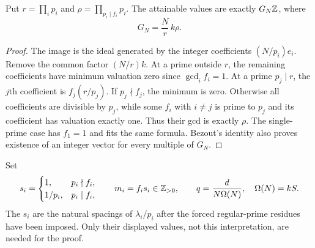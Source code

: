 \begin{lemma}\label{power:lem:ideal}
Put $r=\prod_i p_i$ and $\rho=\prod_{p_i\mid f_i}p_i$. The attainable
values are exactly $G_N\mathbb Z$, where
\[
G_N=\frac Nr\,k\rho.
\]
\end{lemma}
\begin{proof}
The image is the ideal generated by the integer coefficients
$(N/p_i)e_i$. Remove the common factor $(N/r)k$. At a prime outside $r$, the
remaining coefficients have minimum valuation zero since $\gcd_i f_i=1$.
At a prime $p_j\mid r$, the $j$th coefficient is $f_j(r/p_j)$. If
$p_j\nmid f_j$, the minimum is zero. Otherwise all coefficients are
divisible by $p_j$, while some $f_i$ with $i\ne j$ is prime to $p_j$ and its
coefficient has valuation exactly one. Thus their gcd is exactly $\rho$.
The single-prime case has $f_1=1$ and fits the same formula. Bezout's identity
also proves existence of an integer vector for every multiple of $G_N$.
\end{proof}

Set
\[
s_i=\begin{cases}1,&p_i\nmid f_i,\\1/p_i,&p_i\mid f_i,\end{cases}
\qquad m_i=f_i s_i\in\mathbb Z_{>0},\qquad q=\frac{d}{N\Omega(N)},
\quad\Omega(N)=kS.
\]
The $s_i$ are the natural spacings of $\lambda_i/p_i$ after the forced
regular-prime residues have been imposed. Only their displayed values,
not this interpretation, are needed for the proof.

